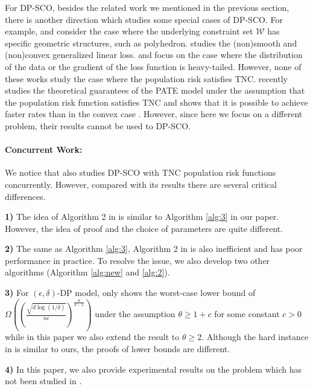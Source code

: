 \documentclass[12pt]{alt2022} %
\begin{document}
For DP-SCO, besides the related work we mentioned in the previous section, there is another direction which studies some special cases of DP-SCO. For example, \citep{bassily2021non} and \citep{asi2021private} consider the case where the underlying constraint set $\mathcal{W}$ has specific geometric structures, such as polyhedron. \citep{guzman2021differentially} studies the (non)smooth and (non)convex generalized linear loss. \citep{wang2020differentially} and \citep{kamath2021improved} focus on the case where the distribution of the data or the gradient of the loss function is heavy-tailed. However, none of these works study the case where the population risk satisfies TNC.  \citep{liu2021revisiting} recently studies the theoretical guarantees of the PATE model \citep{papernot2016semi} under the assumption that the population risk function satisfies TNC and shows that it is possible to achieve faster rates than in the convex case 
\citep{bassily2018model}. However, since here we focus on a different problem, their results cannot be used to DP-SCO. 

\paragraph{Concurrent Work:} We notice that \citep{asi2021adapting} also studies DP-SCO with TNC population risk functions concurrently. However, compared with its results there are several critical differences. 

\textbf{1)}  The idea of Algorithm 2 in \citep{asi2021adapting} is similar to Algorithm \ref{alg:3} in our paper. However, the idea of proof and the choice of parameters are quite different. 

\textbf{2)} The same as Algorithm \ref{alg:3}, Algorithm 2 in \citep{asi2021adapting}  is also inefficient and has poor performance in practice. To resolve the issue, we also develop two other  algorithms (Algorithm \ref{alg:new} and \ref{alg:2}). 

\textbf{3)}  For $(\epsilon, \delta)$-DP model, \citep{asi2021adapting} only shows the worst-case lower bound of  $\Omega((\frac{\sqrt{d\log(1/\delta)}}{n\epsilon})^\frac{\theta}{\theta-1})$ under the assumption $\theta\geq 1+c$ for some constant $c>0$ while in this paper we also extend the result to $\theta\geq 2$. Although the hard instance in \citep{asi2021adapting} is similar to ours, the proofs of lower bounds are different. 

\textbf{4)}  In this paper, we also provide experimental results on the problem which has not been studied in \citep{asi2021adapting}. 
\end{document}
